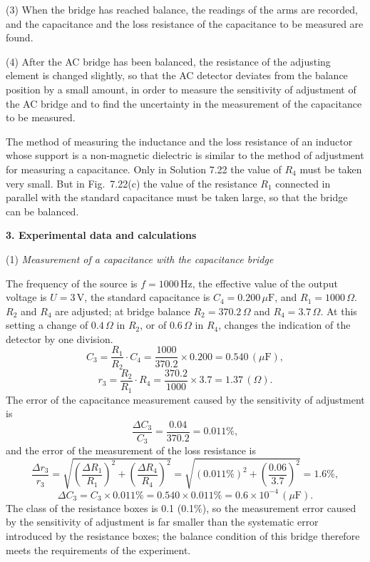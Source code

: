 (3) When the bridge has reached balance, the readings of the arms are recorded, and the capacitance and the loss resistance of the capacitance to be measured are found.

(4) After the AC bridge has been balanced, the resistance of the adjusting element is changed slightly, so that the AC detector deviates from the balance position by a small amount, in order to measure the sensitivity of adjustment of the AC bridge and to find the uncertainty in the measurement of the capacitance to be measured.

The method of measuring the inductance and the loss resistance of an inductor whose support is a non-magnetic dielectric is similar to the method of adjustment for measuring a capacitance. Only in Solution 7.22 the value of $R_4$ must be taken very small. But in Fig.~7.22(c) the value of the resistance $R_1$ connected in parallel with the standard capacitance must be taken large,
so that the bridge can be balanced.

\textbf{3. Experimental data and calculations}

(1) \emph{Measurement of a capacitance with the capacitance bridge}

The frequency of the source is $f=1000\,\mathrm{Hz}$, the effective value of the output voltage is $U=3\,\mathrm{V}$, the standard capacitance is $C_4=0.200\,\mu\mathrm{F}$, and $R_1=1000\,\Omega$. $R_2$ and $R_4$ are adjusted; at bridge balance $R_2=370.2\,\Omega$ and $R_4=3.7\,\Omega$. At this setting a change of $0.4\,\Omega$ in $R_2$, or of $0.6\,\Omega$ in $R_4$, changes the indication of the detector by one division.
\[
C_3=\frac{R_1}{R_2}\cdot C_4=\frac{1000}{370.2}\times0.200=0.540\,(\mu\mathrm{F}),
\]
\[
r_3=\frac{R_2}{R_1}\cdot R_4=\frac{370.2}{1000}\times3.7=1.37\,(\Omega).
\]
The error of the capacitance measurement caused by the sensitivity of adjustment is
\[
\frac{\Delta C_3}{C_3}=\frac{0.04}{370.2}=0.011\%,
\]
and the error of the measurement of the loss resistance is
\[
\frac{\Delta r_3}{r_3}=\sqrt{\left(\frac{\Delta R_1}{R_1}\right)^2+\left(\frac{\Delta R_4}{R_4}\right)^2}
=\sqrt{(0.011\%)^2+\left(\frac{0.06}{3.7}\right)^2}=1.6\%,
\]
\[
\Delta C_3=C_3\times0.011\%=0.540\times0.011\%=0.6\times10^{-4}\,(\mu\mathrm{F}).
\]
The class of the resistance boxes is 0.1 (0.1\%), so the measurement error caused by the sensitivity of adjustment is far smaller than the systematic error introduced by the resistance boxes; the balance condition of this bridge therefore meets the requirements of the experiment.

